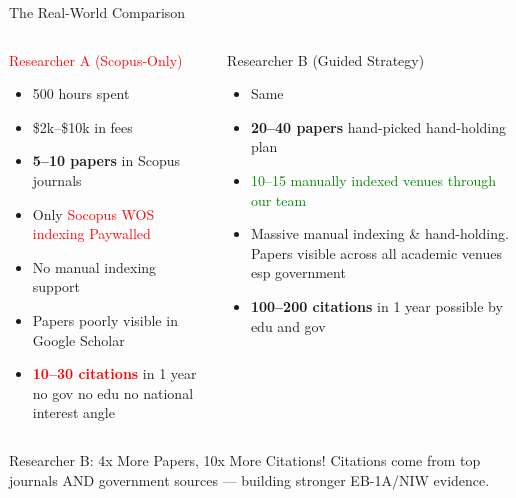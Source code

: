 \documentclass[10pt, aspectratio=169]{beamer}
\begin{document}
	
	\begin{frame}{The Real-World Comparison}
		\begin{columns}[T]
			\begin{block}{\textcolor{red}{Researcher A (Scopus-Only)}}
				\begin{itemize}
					\item 500 hours spent
					\item \$2k–\$10k in fees
					\item \textbf{5–10 papers} in Scopus journals
					\item Only \textcolor{red}{Socopus WOS indexing Paywalled }
					\item No manual indexing support
					\item Papers poorly visible in Google Scholar
					\item \textbf{\textcolor{red}{10–30 citations}} in 1 year no gov no edu no national interest angle
				\end{itemize}
			\end{block}
			
			\begin{block}{\textcolor{myblue}{Researcher B (Guided Strategy)}}
				\begin{itemize}
					\item Same
					\item \textbf{20–40 papers} hand-picked hand-holding plan
					\item \textcolor{green}{10–15 manually indexed venues through our team}
					\item Massive manual indexing \& hand-holding.
				 Papers visible across all academic venues esp government 
					\item \textbf{\textcolor{myblue}{100–200 citations}} in 1 year possible by edu and gov 
				\end{itemize}
			\end{block}
		\end{columns}
		
		\vspace{0.3cm}
		\begin{center}
	
			
			\vspace{0.2cm}
			\tiny{Researcher B: 4x More Papers, 10x More Citations! Citations come from top journals AND government sources — building stronger EB-1A/NIW evidence.}
		\end{center}
	\end{frame}
	
\end{document}
